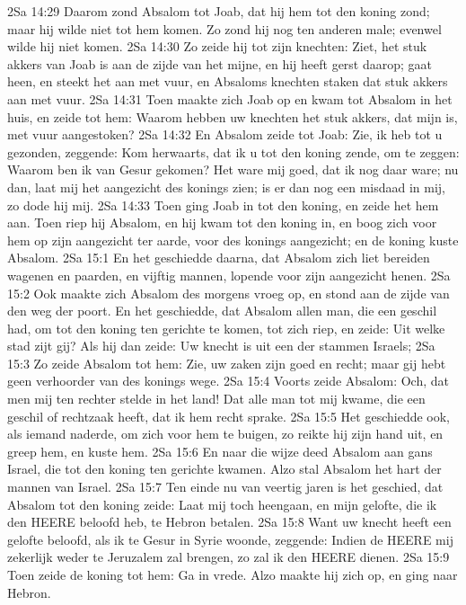 2Sa 14:29  Daarom zond Absalom tot Joab, dat hij hem tot den koning zond; maar hij wilde niet tot hem komen. Zo zond hij nog ten anderen male; evenwel wilde hij niet komen.
2Sa 14:30  Zo zeide hij tot zijn knechten: Ziet, het stuk akkers van Joab is aan de zijde van het mijne, en hij heeft gerst daarop; gaat heen, en steekt het aan met vuur, en Absaloms knechten staken dat stuk akkers aan met vuur.
2Sa 14:31  Toen maakte zich Joab op en kwam tot Absalom in het huis, en zeide tot hem: Waarom hebben uw knechten het stuk akkers, dat mijn is, met vuur aangestoken?
2Sa 14:32  En Absalom zeide tot Joab: Zie, ik heb tot u gezonden, zeggende: Kom herwaarts, dat ik u tot den koning zende, om te zeggen: Waarom ben ik van Gesur gekomen? Het ware mij goed, dat ik nog daar ware; nu dan, laat mij het aangezicht des konings zien; is er dan nog een misdaad in mij, zo dode hij mij.
2Sa 14:33  Toen ging Joab in tot den koning, en zeide het hem aan. Toen riep hij Absalom, en hij kwam tot den koning in, en boog zich voor hem op zijn aangezicht ter aarde, voor des konings aangezicht; en de koning kuste Absalom.
2Sa 15:1  En het geschiedde daarna, dat Absalom zich liet bereiden wagenen en paarden, en vijftig mannen, lopende voor zijn aangezicht henen.
2Sa 15:2  Ook maakte zich Absalom des morgens vroeg op, en stond aan de zijde van den weg der poort. En het geschiedde, dat Absalom allen man, die een geschil had, om tot den koning ten gerichte te komen, tot zich riep, en zeide: Uit welke stad zijt gij? Als hij dan zeide: Uw knecht is uit een der stammen Israels;
2Sa 15:3  Zo zeide Absalom tot hem: Zie, uw zaken zijn goed en recht; maar gij hebt geen verhoorder van des konings wege.
2Sa 15:4  Voorts zeide Absalom: Och, dat men mij ten rechter stelde in het land! Dat alle man tot mij kwame, die een geschil of rechtzaak heeft, dat ik hem recht sprake.
2Sa 15:5  Het geschiedde ook, als iemand naderde, om zich voor hem te buigen, zo reikte hij zijn hand uit, en greep hem, en kuste hem.
2Sa 15:6  En naar die wijze deed Absalom aan gans Israel, die tot den koning ten gerichte kwamen. Alzo stal Absalom het hart der mannen van Israel.
2Sa 15:7  Ten einde nu van veertig jaren is het geschied, dat Absalom tot den koning zeide: Laat mij toch heengaan, en mijn gelofte, die ik den HEERE beloofd heb, te Hebron betalen.
2Sa 15:8  Want uw knecht heeft een gelofte beloofd, als ik te Gesur in Syrie woonde, zeggende: Indien de HEERE mij zekerlijk weder te Jeruzalem zal brengen, zo zal ik den HEERE dienen.
2Sa 15:9  Toen zeide de koning tot hem: Ga in vrede. Alzo maakte hij zich op, en ging naar Hebron.
